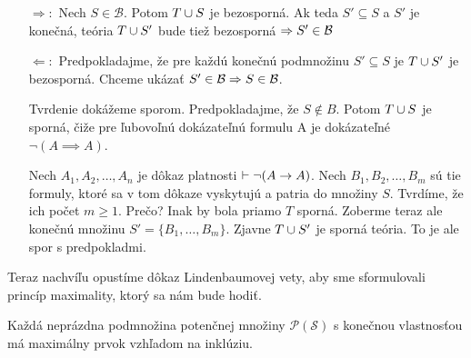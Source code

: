 \begin{dokaz}
   \begin{itemize}
       \item[$\Rightarrow:$]
            Nech $S \in \mathcal{B}$. Potom $T \cup S$ je bezosporná.
            Ak teda $S' \subseteq S$ a  $S'$ je konečná, teória 
            $T \cup S'$ bude tiež bezosporná $\Rightarrow S' \in \mathcal{B}$

        \item[$\Leftarrow:$]
            Predpokladajme, že pre každú konečnú podmnožinu $S' \subseteq S$
            je $T \cup S'$ je bezosporná.
            Chceme ukázať $S' \in \mathcal{B} \Rightarrow S \in \mathcal{B}$.

            Tvrdenie dokážeme sporom.
            Predpokladajme, že $S \not \in B$.
            Potom $T \cup S$ je sporná,
            čiže pre ľubovoľnú dokázateľnú formulu A je dokázateľné
            $\neg(A \implies A)$.

            Nech $A_1, A_2, \dots, A_n$ je dôkaz platnosti 
                $\vdash \neg(A \rightarrow A)$.
            Nech $B_1, B_2, \dots, B_m$ sú tie formuly,
            ktoré sa v tom dôkaze vyskytujú a patria do množiny $S$.
            Tvrdíme, že ich počet $m \ge 1$.
            Prečo? Inak by bola priamo $T$ sporná.
            Zoberme teraz ale konečnú množinu $S'=\{B_1, \dots, B_m\}$.
            Zjavne $T \cup S'$ je sporná teória.
            To je ale spor s predpokladmi.
    \end{itemize}

    Teraz nachvíľu opustíme dôkaz Lindenbaumovej vety, aby sme
    sformulovali princíp maximality, ktorý sa nám bude hodiť.
    \\
\end{dokaz}

\begin{lema}
    Každá neprázdna podmnožina potenčnej množiny
    $\mathcal{P}(\mathscr{S})$ s konečnou vlastnosťou 
    má maximálny prvok vzhľadom na inklúziu.
\end{lema}

